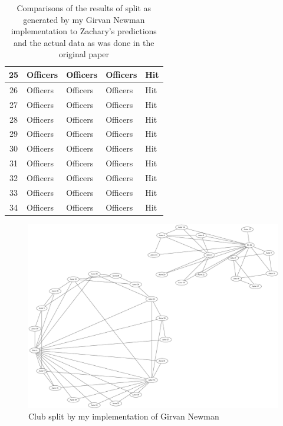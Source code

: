 \documentclass[letterpaper,10pt]{article}
\begin{document}
\begin{table}
\begin{tabular}{ | c | p{2cm} | p{2cm} | p{2cm} | p{2cm} | }
\hline
25 & Officers & Officers & Officers & Hit \\
\hline
26 & Officers & Officers & Officers & Hit \\
\hline
27 & Officers & Officers & Officers & Hit \\
\hline
28 & Officers & Officers & Officers & Hit \\
\hline
29 & Officers & Officers & Officers & Hit \\
\hline
30 & Officers & Officers & Officers & Hit \\
\hline
31 & Officers & Officers & Officers & Hit \\
\hline
32 & Officers & Officers & Officers & Hit \\
\hline
33 & Officers & Officers & Officers & Hit \\
\hline
34 & Officers & Officers & Officers & Hit \\
\hline
\end{tabular}
\caption{Comparisons of the results of split as generated by my Girvan Newman implementation to Zachary's predictions and the actual data as was done in the original paper}
\label{tab:modcomp}
\end{table}



\begin{figure}
\begin{center}
\includegraphics[scale=0.2]{supportingMaterials/weightedkclub/kc.png}
\caption{Club split by my implementation of Girvan Newman}
\label{fig:psplit}
\end{center}
\end{figure}
\end{document}
